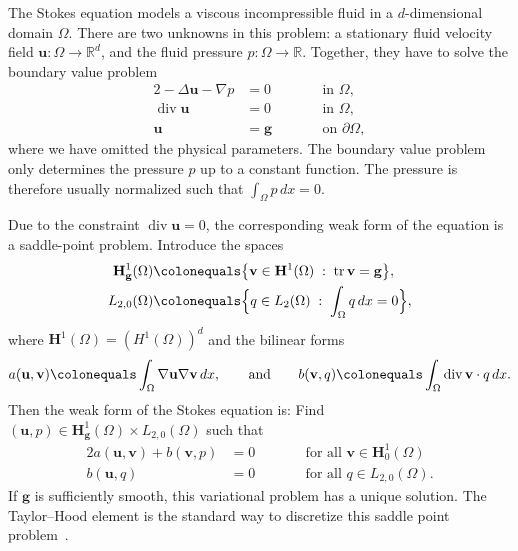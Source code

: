 \documentclass[a4paper,10pt,headings=normal,bibliography=totoc]{scrartcl}
\newcommand{\R}{\mathbb{R}}
\renewcommand{\div}{\operatorname{div}}
\begin{document}
The Stokes equation models a viscous incompressible
fluid in a $d$-dimensional domain $\Omega$.  There are two unknowns in this problem: a stationary
fluid velocity field $\mathbf{u} : \Omega \to \R^d$, and the fluid pressure $p : \Omega \to \R$.
Together, they have to solve the boundary value problem
\begin{alignat*}{2}
 -\Delta \mathbf{u} - \nabla p & = 0  & \qquad & \text{in $\Omega$}, \\
 \div \mathbf{u} & = 0                &        & \text{in $\Omega$}, \\
                    \mathbf{u} & = \mathbf{g}  &        & \text{on $\partial \Omega$},
\end{alignat*}
where we have omitted the physical parameters.  The boundary value problem only determines the
pressure $p$ up to a constant function.  The pressure is therefore usually normalized such
that $\int_\Omega p\,dx = 0$.

Due to the constraint $\div \mathbf{u} = 0$, the corresponding weak form of the equation is a saddle-point problem.
Introduce the spaces
\begin{align*}
  \mathbf{H}^1_{\mathbf{g}}(\Omega)
      & \colonequals
      \big\{ \mathbf{v} \in \mathbf{H}^1(\Omega) \; :\; \operatorname{tr}{\mathbf{v}} = \mathbf{g} \big\}, \\
 L_{2,0}(\Omega) & \colonequals  \Big\{ q \in L_2(\Omega) \; :\; \int_\Omega q\,dx = 0 \Big\},
\end{align*}
where $\mathbf{H}^1(\Omega) = (H^1(\Omega))^d$ and the bilinear forms
\begin{equation*}
 a(\mathbf{u},\mathbf{v}) \colonequals \int_\Omega \nabla \mathbf{u} \nabla \mathbf{v} \,dx,
 \qquad \text{and} \qquad
 b(\mathbf{v},q) \colonequals \int_\Omega \div \mathbf{v} \cdot q \,dx.
\end{equation*}
Then the weak form of the Stokes equation is: Find $(\mathbf{u},p) \in \mathbf{H}_{\mathbf{g}}^1(\Omega) \times L_{2,0}(\Omega)$ such that
\begin{alignat*}{2}
 a(\mathbf{u},\mathbf{v}) + b(\mathbf{v},p) & = 0 & \qquad & \text{for all $\mathbf{v} \in \mathbf{H}_0^1(\Omega)$} \\
 b(\mathbf{u},q)\qquad\qquad & = 0       &        & \text{for all $q \in L_{2,0}(\Omega)$}.
\end{alignat*}
If $\mathbf{g}$ is sufficiently smooth, this variational problem has a unique solution.
The Taylor--Hood element is the standard way to discretize this saddle point problem~\cite{braess:2013}.
\end{document}
